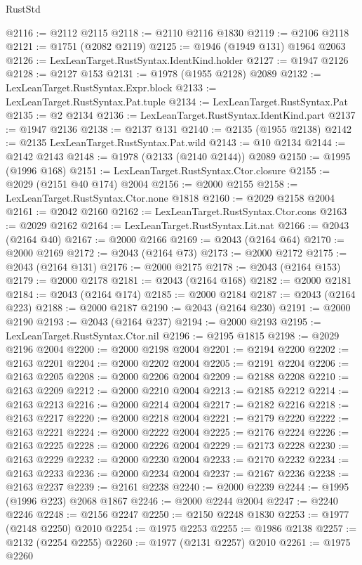 \begin{lexlean}{RustStd}
\begin{coremodule}
@2116 := @2112 @2115
@2118 := @2110 @2116 @1830
@2119 := @2106 @2118
@2121 := @1751 (@2082 @2119)
@2125 := @1946 (@1949 @131) @1964 @2063
@2126 := LexLeanTarget.RustSyntax.IdentKind.holder
@2127 := @1947 @2126
@2128 := @2127 @153
@2131 := @1978 (@1955 @2128) @2089
@2132 := LexLeanTarget.RustSyntax.Expr.block
@2133 := LexLeanTarget.RustSyntax.Pat.tuple
@2134 := LexLeanTarget.RustSyntax.Pat
@2135 := @2 @2134
@2136 := LexLeanTarget.RustSyntax.IdentKind.part
@2137 := @1947 @2136
@2138 := @2137 @131
@2140 := @2135 (@1955 @2138)
@2142 := @2135 LexLeanTarget.RustSyntax.Pat.wild
@2143 := @10 @2134
@2144 := @2142 @2143
@2148 := @1978 (@2133 (@2140 @2144)) @2089
@2150 := @1995 (@1996 @168)
@2151 := LexLeanTarget.RustSyntax.Ctor.closure
@2155 := @2029 (@2151 @40 @174) @2004
@2156 := @2000 @2155
@2158 := LexLeanTarget.RustSyntax.Ctor.none @1818
@2160 := @2029 @2158 @2004
@2161 := @2042 @2160
@2162 := LexLeanTarget.RustSyntax.Ctor.cons
@2163 := @2029 @2162
@2164 := LexLeanTarget.RustSyntax.Lit.nat
@2166 := @2043 (@2164 @40)
@2167 := @2000 @2166
@2169 := @2043 (@2164 @64)
@2170 := @2000 @2169
@2172 := @2043 (@2164 @73)
@2173 := @2000 @2172
@2175 := @2043 (@2164 @131)
@2176 := @2000 @2175
@2178 := @2043 (@2164 @153)
@2179 := @2000 @2178
@2181 := @2043 (@2164 @168)
@2182 := @2000 @2181
@2184 := @2043 (@2164 @174)
@2185 := @2000 @2184
@2187 := @2043 (@2164 @223)
@2188 := @2000 @2187
@2190 := @2043 (@2164 @230)
@2191 := @2000 @2190
@2193 := @2043 (@2164 @237)
@2194 := @2000 @2193
@2195 := LexLeanTarget.RustSyntax.Ctor.nil
@2196 := @2195 @1815
@2198 := @2029 @2196 @2004
@2200 := @2000 @2198 @2004
@2201 := @2194 @2200
@2202 := @2163 @2201
@2204 := @2000 @2202 @2004
@2205 := @2191 @2204
@2206 := @2163 @2205
@2208 := @2000 @2206 @2004
@2209 := @2188 @2208
@2210 := @2163 @2209
@2212 := @2000 @2210 @2004
@2213 := @2185 @2212
@2214 := @2163 @2213
@2216 := @2000 @2214 @2004
@2217 := @2182 @2216
@2218 := @2163 @2217
@2220 := @2000 @2218 @2004
@2221 := @2179 @2220
@2222 := @2163 @2221
@2224 := @2000 @2222 @2004
@2225 := @2176 @2224
@2226 := @2163 @2225
@2228 := @2000 @2226 @2004
@2229 := @2173 @2228
@2230 := @2163 @2229
@2232 := @2000 @2230 @2004
@2233 := @2170 @2232
@2234 := @2163 @2233
@2236 := @2000 @2234 @2004
@2237 := @2167 @2236
@2238 := @2163 @2237
@2239 := @2161 @2238
@2240 := @2000 @2239
@2244 := @1995 (@1996 @223) @2068 @1867
@2246 := @2000 @2244 @2004
@2247 := @2240 @2246
@2248 := @2156 @2247
@2250 := @2150 @2248 @1830
@2253 := @1977 (@2148 @2250) @2010
@2254 := @1975 @2253
@2255 := @1986 @2138
@2257 := @2132 (@2254 @2255)
@2260 := @1977 (@2131 @2257) @2010
@2261 := @1975 @2260

\end{coremodule}
\end{lexlean}
